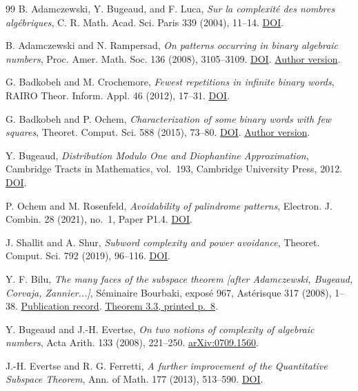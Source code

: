 \documentclass[11pt,reqno,a4paper]{amsart}
\theoremstyle{remark}
\begin{document}
\begin{thebibliography}{99}
B. Adamczewski, Y. Bugeaud, and F. Luca,
\emph{Sur la complexit\'e des nombres alg\'ebriques},
C. R. Math. Acad. Sci. Paris 339 (2004), 11--14.
\href{https://doi.org/10.1016/j.crma.2004.04.012}{DOI}.

B. Adamczewski and N. Rampersad,
\emph{On patterns occurring in binary algebraic numbers},
Proc. Amer. Math. Soc. 136 (2008), 3105--3109.
\href{https://doi.org/10.1090/S0002-9939-08-09319-2}{DOI}.
\href{https://adamczewski.perso.math.cnrs.fr/Overlap.pdf}{Author version}.

G. Badkobeh and M. Crochemore,
\emph{Fewest repetitions in infinite binary words},
RAIRO Theor. Inform. Appl. 46 (2012), 17--31.
\href{https://doi.org/10.1051/ita/2011109}{DOI}.

G. Badkobeh and P. Ochem,
\emph{Characterization of some binary words with few squares},
Theoret. Comput. Sci. 588 (2015), 73--80.
\href{https://doi.org/10.1016/j.tcs.2015.03.044}{DOI}.
\href{https://www.lirmm.fr/~ochem/morphisms/avoidability.pdf}{Author version}.

Y. Bugeaud,
\emph{Distribution Modulo One and Diophantine Approximation},
Cambridge Tracts in Mathematics, vol.~193, Cambridge University Press,
2012.
\href{https://doi.org/10.1017/CBO9781139017732}{DOI}.

P. Ochem and M. Rosenfeld,
\emph{Avoidability of palindrome patterns},
Electron. J. Combin. 28 (2021), no.~1, Paper P1.4.
\href{https://doi.org/10.37236/9593}{DOI}.

J. Shallit and A. Shur,
\emph{Subword complexity and power avoidance},
Theoret. Comput. Sci. 792 (2019), 96--116.
\href{https://doi.org/10.1016/j.tcs.2018.09.010}{DOI}.

Y. F. Bilu, \emph{The many faces of the subspace theorem [after
Adamczewski, Bugeaud, Corvaja, Zannier...]}, S\'eminaire Bourbaki,
expos\'e 967, Ast\'erisque 317 (2008), 1--38.
\href{https://www.numdam.org/book-part/AST_2008__317__1_0/}{Publication record}.
\href{https://arxiv.org/pdf/0907.2098#page=8}{Theorem 3.3, printed p.~8}.

Y. Bugeaud and J.-H. Evertse, \emph{On two notions of complexity of algebraic numbers}, Acta Arith. 133 (2008), 221--250. \href{https://arxiv.org/abs/0709.1560}{arXiv:0709.1560}.

J.-H. Evertse and R. G. Ferretti, \emph{A further improvement of the Quantitative Subspace Theorem}, Ann. of Math. 177 (2013), 513--590. \href{https://doi.org/10.4007/annals.2013.177.2.4}{DOI}.


\end{thebibliography}
\end{document}
